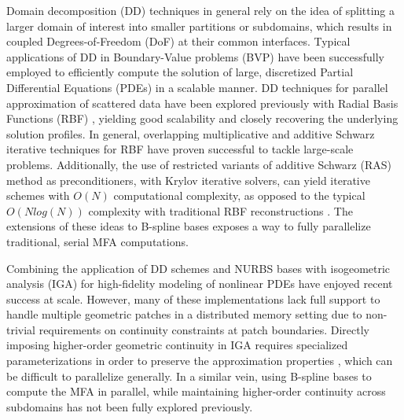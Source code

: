 \label{sec:related-work}

Domain decomposition (DD) techniques in general rely on the idea of splitting a larger domain of interest into smaller partitions or subdomains, which results in coupled Degrees-of-Freedom (DoF) at their common interfaces. Typical applications of DD in Boundary-Value problems (BVP) \cite{smith-ddm, lions-asm} have been successfully employed to efficiently compute the solution of large, discretized Partial Differential Equations (PDEs) in a scalable manner. 
DD techniques for parallel approximation of scattered data have been explored previously with Radial Basis Functions (RBF) \cite{mai-approx-rbf}, yielding good scalability and closely recovering the underlying solution profiles. In general, overlapping multiplicative and additive Schwarz \cite{orasm-as-ms-2007} iterative techniques for RBF \cite{ddm-rbf} have proven successful to tackle large-scale problems. Additionally, the use of restricted variants of additive Schwarz (RAS) method as preconditioners, with Krylov iterative solvers, can yield iterative schemes \cite{yokota-rasm-rbf} with $O(N)$ computational complexity, as opposed to the typical $O(N log(N))$ complexity with traditional RBF reconstructions \cite{ddm-rbf-fast}. The extensions of these ideas to B-spline bases exposes a way to fully parallelize traditional, serial MFA computations.

Combining the application of DD schemes and NURBS bases with isogeometric analysis (IGA) \cite{cottrell2009, da2012} for high-fidelity modeling of nonlinear PDEs \cite{dede2015, marini2015parallel, petiga-dalcin-2016} have enjoyed recent success at scale. However, many of these implementations lack full support to handle multiple geometric patches in a distributed memory setting due to non-trivial requirements on continuity constraints at patch boundaries. 
Directly imposing higher-order geometric continuity in IGA requires specialized parameterizations in order to preserve the approximation properties \cite{kapl2018construction}, which can be difficult to parallelize \cite{hofer2018fast} generally. 
%
In a similar vein, using B-spline bases to compute the MFA in parallel, while maintaining higher-order continuity across subdomains has not been fully explored previously. 

